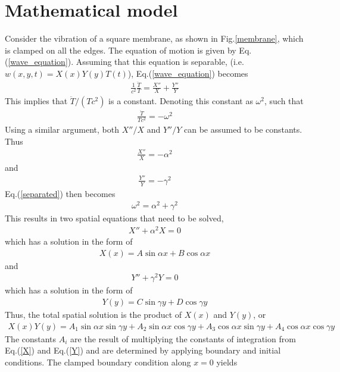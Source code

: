 \documentclass[12pt]{article}
\begin{document}
\section{Mathematical model}
Consider the vibration of a square membrane, as shown in Fig.\ref{membrane}, which is clamped on all the edges.  The equation of motion is given by Eq.(\ref{wave_equation}).  Assuming that this equation is separable, (i.e. $w(x,y,t)=X(x)Y(y)T(t)$), Eq.(\ref{wave_equation}) becomes
\begin{align}
	\label{separated}
	\frac{1}{c^2}\frac{\ddot{T}}{T}=\frac{X''}{X}+\frac{Y''}{Y}
\end{align}
This implies that $\ddot{T}/\left(Tc^2\right)$ is a constant.  Denoting this constant as $\omega^2$, such that
\begin{align}
	\frac{\ddot{T}}{Tc^2}=-\omega^2
\end{align}
Using a similar argument, both $X''/X$ and $Y''/Y$ can be assumed to be constants.  Thus
\begin{align}
	\frac{X''}{X}=-\alpha^2
\end{align}
and
\begin{align}
	\frac{Y''}{Y}=-\gamma^2
\end{align}
Eq.(\ref{separated}) then becomes
\begin{align}
	\label{quadratic}
	\omega^2=\alpha^2+\gamma^2
\end{align}
This results in two spatial equations that need to be solved,
\begin{align}
	X''+\alpha^2X=0
\end{align}
which has a solution in the form of
\begin{align}
	\label{X}
	X(x)=A\sin\alpha x+B\cos\alpha x
\end{align}
and
\begin{align}
	Y''+\gamma^2Y=0
\end{align}
which has a solution in the form of
\begin{align}
	\label{Y}
	Y(y)=C\sin\gamma y+D\cos\gamma y
\end{align}
Thus, the total spatial solution is the product of $X(x)$ and $Y(y)$, or
\begin{align}
	X(x)Y(y)=A_1\sin\alpha x\sin\gamma y+A_2\sin\alpha x\cos\gamma y+A_3\cos\alpha x\sin\gamma y+A_4\cos\alpha x\cos\gamma y
\end{align}
The constants $A_i$ are the result of multiplying the constants of integration from Eq.(\ref{X}) and Eq.(\ref{Y}) and are determined by applying boundary and initial conditions.  The clamped boundary condition along $x=0$ yields
\end{document}
